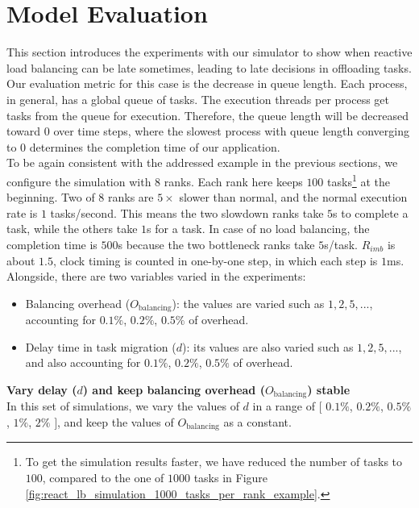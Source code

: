 \section{Model Evaluation}
\label{sec:Model-Evaluation}

This section introduces the experiments with our simulator to show when reactive load balancing can be late sometimes, leading to late decisions in offloading tasks. Our evaluation metric for this case is the decrease in queue length. Each process, in general, has a global queue of tasks. The execution threads per process get tasks from the queue for execution. Therefore, the queue length will be decreased toward $0$ over time steps, where the slowest process with queue length converging to $0$ determines the completion time of our application.\\

To be again consistent with the addressed example in the previous sections, we configure the simulation with $8$ ranks. Each rank here keeps $100$ tasks\footnote{To get the simulation results faster, we have reduced the number of tasks to $100$, compared to the one of $1000$ tasks in Figure \ref{fig:react_lb_simulation_1000_tasks_per_rank_example}.} at the beginning. Two of $8$ ranks are $5\times$ slower than normal, and the normal execution rate is $1$ tasks/second. This means the two slowdown ranks take $5$s to complete a task, while the others take $1$s for a task. In case of no load balancing, the completion time is $500$s because the two bottleneck ranks take $5$s/task. $R_{imb}$ is about $1.5$, clock timing is counted in one-by-one step, in which each step is $1$ms. Alongside, there are two variables varied in the experiments:
\begin{itemize}
	\item Balancing overhead ($O_{\text{balancing}}$): the values are varied such as $1, 2, 5, ...$, accounting for $0.1\%$, $0.2\%$, $0.5\%$ of overhead. 
	\item Delay time in task migration ($d$): its values are also varied such as $1, 2, 5, ...$, and also accounting for $0.1\%$, $0.2\%$, $0.5\%$ of overhead. 
\end{itemize}

\noindent \textbf{Vary delay ($d$) and keep balancing overhead ($O_{\text{balancing}}$) stable}\\
\noindent In this set of simulations, we vary the values of $d$ in a range of $[$ $0.1\%$, $0.2\%$, $0.5\%$, $1\%$, $2\%$ $]$, and keep the values of $O_{\text{balancing}}$ as a constant. \\


